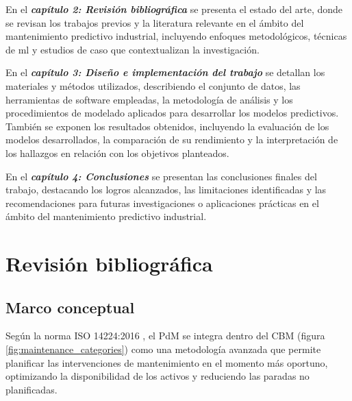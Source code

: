 \documentclass[IB]{TFUOC}
\begin{document}
En el \textbf{\textit{capítulo 2: Revisión bibliográfica}} se presenta el estado del arte, donde se revisan los trabajos
previos y la literatura relevante en el ámbito del mantenimiento predictivo industrial, incluyendo enfoques
metodológicos, técnicas de \gls{ml} y estudios de caso que contextualizan la investigación.

En el \textbf{\textit{capítulo 3: Diseño e implementación del trabajo}} se detallan los materiales y métodos utilizados,
describiendo el conjunto de datos, las herramientas de software empleadas, la metodología de análisis y los
procedimientos de modelado aplicados para desarrollar los modelos predictivos. También se exponen los resultados
obtenidos, incluyendo la evaluación de los modelos desarrollados, la comparación de su rendimiento y la interpretación
de los hallazgos en relación con los objetivos planteados.

En el \textbf{\textit{capítulo 4: Conclusiones}} se presentan las conclusiones finales del trabajo, destacando los
logros alcanzados, las limitaciones identificadas y las recomendaciones para futuras investigaciones o aplicaciones
prácticas en el ámbito del mantenimiento predictivo industrial.

\chapter{Revisión bibliográfica}

\section{Marco conceptual}

Según la norma ISO 14224:2016 \cite{UNE-ENISO142242016}, el \gls{PdM} se integra dentro del \gls{CBM} (figura
\ref{fig:maintenance_categories}) como una metodología avanzada que permite planificar las intervenciones de
mantenimiento en el momento más oportuno, optimizando la disponibilidad de los activos y reduciendo las paradas no
planificadas.
\end{document}
